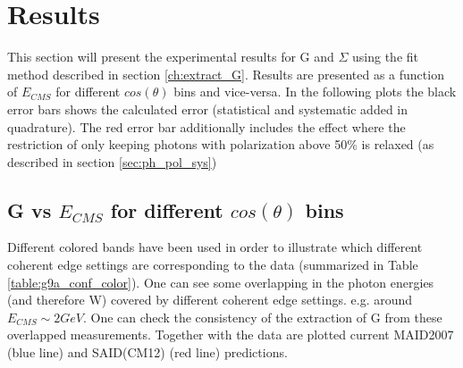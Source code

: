 \section{Results}
This section will present the experimental results for G and $\Sigma$ using the fit method described in section \ref{ch:extract_G}. 
Results are presented as a function of $E_{CMS}$ for different $cos(\theta)$ bins and vice-versa. 
In the following plots the black error bars shows the calculated error (statistical and systematic added in quadrature). The red error bar additionally includes the effect where the restriction of only keeping photons with polarization above 50\% is relaxed (as described in section \ref{sec:ph_pol_sys})



\subsection{G vs \texorpdfstring{$E_{CMS}$}{E-CMS} for different \texorpdfstring{$cos(\theta)$}{cos(theta)} bins}\label{ch:result_W}
Different colored bands have been used in order to illustrate which different coherent edge settings are corresponding to the data (summarized in Table \ref{table:g9a_conf_color}). One can see some overlapping in the photon energies (and therefore W) covered by different coherent edge settings. e.g.  around $E_{CMS} \sim 2 GeV$. One can check the consistency of the extraction of G from these overlapped measurements. Together with the data are plotted current MAID2007 \cite{MAID_2007} (blue line)  and SAID(CM12) \cite{PhysRevC.86.015202} (red line) predictions.
